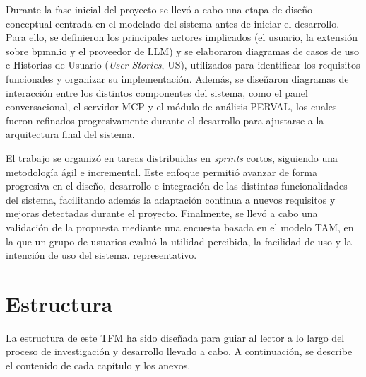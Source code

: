 Durante la fase inicial del proyecto se llevó a cabo una etapa de diseño conceptual centrada en el modelado del sistema antes de iniciar el desarrollo. Para ello, se definieron  los principales actores implicados (el usuario, la extensión sobre bpmn.io y el proveedor de LLM) y se elaboraron diagramas de casos de uso e Historias de Usuario (\textit{User Stories}, US), utilizados para identificar los requisitos funcionales y organizar su implementación. Además, se diseñaron diagramas de interacción entre los distintos componentes del sistema, como el panel conversacional, el servidor MCP y el módulo de análisis PERVAL, los cuales fueron refinados progresivamente durante el desarrollo para ajustarse a la arquitectura final del sistema.

El trabajo se organizó en tareas distribuidas en \textit{sprints} cortos, siguiendo una metodología ágil e incremental. Este enfoque permitió avanzar de forma progresiva en el diseño, desarrollo e integración de las distintas funcionalidades del sistema, facilitando además la adaptación continua a nuevos requisitos y mejoras detectadas durante el proyecto. Finalmente, se llevó a cabo una validación de la propuesta mediante una encuesta basada en el modelo TAM, en la que un grupo de usuarios evaluó la utilidad percibida, la facilidad de uso y la intención de uso del sistema. representativo.

\section{Estructura}

La estructura de este TFM ha sido diseñada para guiar al lector a lo largo del proceso de investigación y desarrollo llevado a cabo. A continuación, se describe el contenido de cada capítulo y los anexos.

